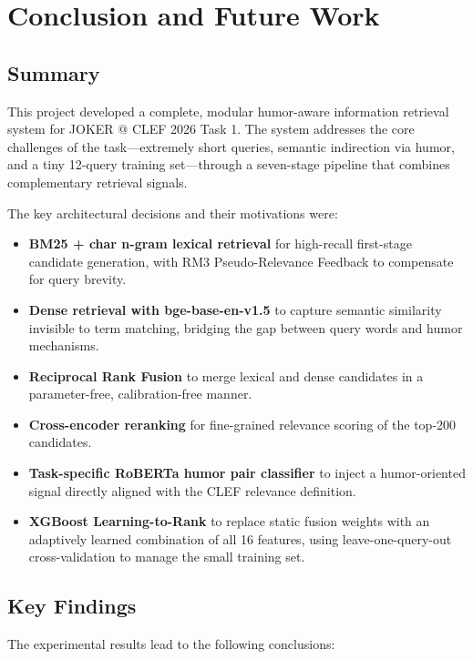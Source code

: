 \chapter{Conclusion and Future Work}
\justify

\section{Summary}

This project developed a complete, modular humor-aware information retrieval system for JOKER @ CLEF 2026 Task 1. The system addresses the core challenges of the task---extremely short queries, semantic indirection via humor, and a tiny 12-query training set---through a seven-stage pipeline that combines complementary retrieval signals.

The key architectural decisions and their motivations were:
\begin{itemize}
    \item \textbf{BM25 + char n-gram lexical retrieval} for high-recall first-stage candidate generation, with RM3 Pseudo-Relevance Feedback to compensate for query brevity.
    \item \textbf{Dense retrieval with bge-base-en-v1.5} to capture semantic similarity invisible to term matching, bridging the gap between query words and humor mechanisms.
    \item \textbf{Reciprocal Rank Fusion} to merge lexical and dense candidates in a parameter-free, calibration-free manner.
    \item \textbf{Cross-encoder reranking} for fine-grained relevance scoring of the top-200 candidates.
    \item \textbf{Task-specific RoBERTa humor pair classifier} to inject a humor-oriented signal directly aligned with the CLEF relevance definition.
    \item \textbf{XGBoost Learning-to-Rank} to replace static fusion weights with an adaptively learned combination of all 16 features, using leave-one-query-out cross-validation to manage the small training set.
\end{itemize}

\section{Key Findings}

The experimental results lead to the following conclusions:

